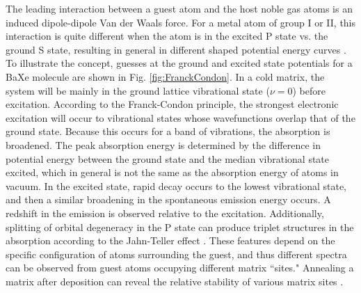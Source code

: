 The leading interaction between a guest atom and the host noble gas atoms is an induced dipole-dipole Van der Waals force.  For a metal atom of group I or II, this interaction is quite different when the atom is in the excited P state vs. the ground S state, resulting in general in different shaped potential energy curves \cite{crepin}.  To illustrate the concept, guesses at the ground and excited state potentials for a BaXe molecule are shown in Fig. \ref{fig:FranckCondon}.  In a cold matrix, the system will be mainly in the ground lattice vibrational state ($\nu =0$) before excitation.  According to the Franck-Condon principle, the strongest electronic excitation will occur to vibrational states whose wavefunctions overlap that of the ground state.  Because this occurs for a band of vibrations, the absorption is broadened.  The peak absorption energy is determined by the difference in potential energy between the ground state and the median vibrational state excited, which in general is not the same as the absorption energy of atoms in vacuum.  In the excited state, rapid decay occurs to the lowest vibrational state, and then a similar broadening in the spontaneous emission energy occurs.  A redshift in the emission is observed relative to the excitation.  Additionally, splitting of orbital degeneracy in the P state can produce triplet structures in the absorption according to the Jahn-Teller effect \cite{jahnteller}.  These features depend on the specific configuration of atoms surrounding the guest, and thus different spectra can be observed from guest atoms occupying different matrix ``sites."  Annealing a matrix after deposition can reveal the relative stability of various matrix sites \cite{crepin}.






